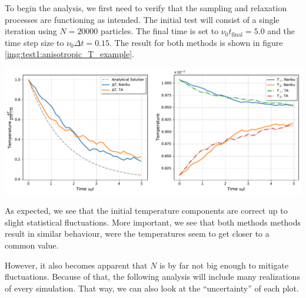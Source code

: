 To begin the analysis, we first need to verify that the sampling and relaxation processes are functioning as intended. The initial test will consist of a single iteration using $N=20000$ particles. The final time is set to $\nu_0t_\mathrm{final} = 5.0$ and the time step size to $\nu_0\Delta t = 0.15$. The result for both methods is shown in figure \ref{img:test1:anisotropic_T_example}. \\
\begin{minipage}[h]{\linewidth}
    \vspace{5pt}
    \centering
    \includegraphics[width=\linewidth]{ressources/test1/anisotropic_T_example.pdf}
    \label{img:test1:anisotropic_T_example}
    \vspace{5pt}
\end{minipage}
As expected, we see that the initial temperature components are correct up to slight statistical fluctuations. More important, we see that both methods methods result in similar behaviour, were the temperatures seem to get closer to a common value. 

However, it also becomes apparent that $N$ is by far not big enough to mitigate fluctuations. Because of that, the following analysis will include many realizations of every simulation. That way, we can also look at the ``uncertainty'' of each plot. 

